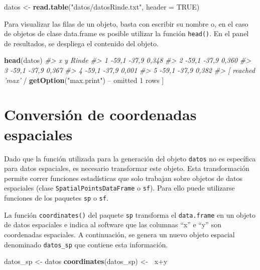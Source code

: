 \documentclass[11pt,b5paper,]{krantz}
\newenvironment{Shaded}{}{}
\newcommand{\KeywordTok}[1]{\textcolor[rgb]{0.00,0.44,0.13}{\textbf{#1}}}
\newcommand{\DataTypeTok}[1]{\textcolor[rgb]{0.56,0.13,0.00}{#1}}
\newcommand{\DecValTok}[1]{\textcolor[rgb]{0.25,0.63,0.44}{#1}}
\newcommand{\StringTok}[1]{\textcolor[rgb]{0.25,0.44,0.63}{#1}}
\newcommand{\CommentTok}[1]{\textcolor[rgb]{0.38,0.63,0.69}{\textit{#1}}}
\newcommand{\OtherTok}[1]{\textcolor[rgb]{0.00,0.44,0.13}{#1}}
\newcommand{\OperatorTok}[1]{\textcolor[rgb]{0.40,0.40,0.40}{#1}}
\newcommand{\ErrorTok}[1]{\textcolor[rgb]{1.00,0.00,0.00}{\textbf{#1}}}
\newcommand{\NormalTok}[1]{#1}
\begin{document}
\begin{Shaded}
\begin{Highlighting}[]
\NormalTok{datos <-}\StringTok{ }\KeywordTok{read.table}\NormalTok{(}\StringTok{"datos/datosRinde.txt"}\NormalTok{, }
                    \DataTypeTok{header =} \OtherTok{TRUE}\NormalTok{)}
\end{Highlighting}
\end{Shaded}

Para visualizar las filas de un objeto, basta con escribir su nombre o,
en el caso de objetos de clase data.frame es posible utilizar la función
\texttt{head()}. En el panel de resultados, se despliega el contenido
del objeto.

\begin{Shaded}
\begin{Highlighting}[]
\KeywordTok{head}\NormalTok{(datos)}
\CommentTok{#> x y Rinde}
\CommentTok{#> 1 -59,1 -37,9 0,348}
\CommentTok{#> 2 -59,1 -37,9 0,360}
\CommentTok{#> 3 -59,1 -37,9 0,367}
\CommentTok{#> 4 -59,1 -37,9 0,001}
\CommentTok{#> 5 -59,1 -37,9 0,382}
\CommentTok{#> [ reached 'max'}
    \OperatorTok{/}\StringTok{ }\KeywordTok{getOption}\NormalTok{(}\StringTok{"max.print"}\NormalTok{) }\OperatorTok{--}
\NormalTok{omitted }\DecValTok{1}\NormalTok{ rows ]}
\end{Highlighting}
\end{Shaded}

\section{Conversión de coordenadas
espaciales}\label{conversiuxf3n-de-coordenadas-espaciales}

Dado que la función utilizada para la generación del objeto
\texttt{datos} no es específica para datos espaciales, es necesario
transformar este objeto. Esta transformación permite correr funciones
estadísticas que solo trabajan sobre objetos de datos espaciales (clase
\texttt{SpatialPointsDataFrame} o \texttt{sf}). Para ello puede
utilizarse funciones de los paquetes \texttt{sp} o \texttt{sf}.

La función \texttt{coordinates()} del paquete \texttt{sp} transforma el
\texttt{data.frame} en un objeto de datos espaciales e indica al
software que las columnas ``x'' e ``y'' son coordenadas espaciales. A
continuación, se genera un nuevo objeto espacial denominado
\texttt{datos\_sp} que contiene esta información.

\begin{Shaded}
\begin{Highlighting}[]
\NormalTok{datos_sp <-}\StringTok{ }\NormalTok{datos}
\KeywordTok{coordinates}\NormalTok{(datos_sp) <-}\StringTok{ }\ErrorTok{~}\NormalTok{x}\OperatorTok{+}\NormalTok{y}
\end{Highlighting}
\end{Shaded}
\end{document}
